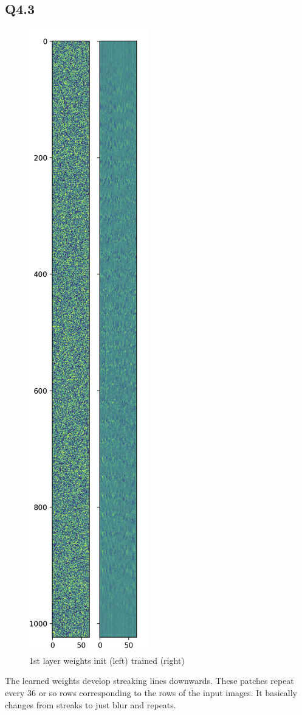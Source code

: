 \documentclass{article}
\begin{document}
\subsection*{Q4.3}
\begin{figure}[htbp]
    \centering
    \includegraphics[width=0.2\linewidth]{weights_rep.png}
    \caption{1st layer weights init (left) trained (right)}
  \end{figure}
  The learned weights develop streaking lines downwards. These patches repeat every 
  36 or so rows corresponding to the rows of the input images. It basically changes 
  from streaks to just blur and repeats.
\newpage
\end{document}
